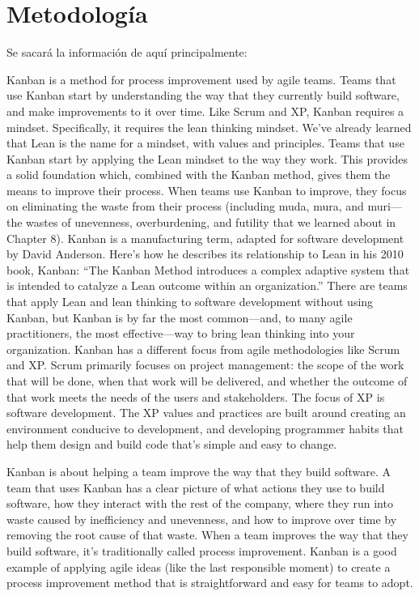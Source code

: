 \section{Metodología}\label{sec:metodologia}


Se sacará la información de aquí principalmente:
\cite{Cole2015-fd} %
\cite{Stellman2014-qr} %

Kanban is a method for process improvement used by agile teams. Teams that use
Kanban start by understanding the way that they currently build software, and make
improvements to it over time. Like Scrum and XP, Kanban requires a mindset.
Specifically, it requires the lean thinking mindset. We've already learned that
Lean is the
name for a mindset, with values and principles. Teams that use Kanban start by
applying the Lean mindset to the way they work. This provides a solid foundation
which, combined with the Kanban method, gives them the means to improve their
process. When teams use Kanban to improve, they focus on eliminating the waste
from their process (including muda, mura, and muri—the wastes of unevenness,
overburdening, and futility that we learned about in Chapter 8).
Kanban is a manufacturing term, adapted for software development by David
Anderson. Here's how he describes its relationship to Lean in his 2010 book,
Kanban: “The
Kanban Method introduces a complex adaptive system that is intended to catalyze a
Lean outcome within an organization.” There are teams that apply Lean and lean
thinking to software development without using Kanban, but Kanban is by far the
most common—and, to many agile practitioners, the most effective—way to bring
lean thinking into your organization.
Kanban has a different focus from agile methodologies like Scrum and XP. Scrum
primarily focuses on project management: the scope of the work that will be
done, when
that work will be delivered, and whether the outcome of that work meets the needs of
the users and stakeholders. The focus of XP is software development. The XP values
and practices are built around creating an environment conducive to development,
and developing programmer habits that help them design and build code that's simple and easy to change.

Kanban is about helping a team improve the way that they build software. A team that
uses Kanban has a clear picture of what actions they use to build software, how they
interact with the rest of the company, where they run into waste caused by
inefficiency and unevenness, and how to improve over time by removing the root
cause of
that waste. When a team improves the way that they build software, it's traditionally
called process improvement. Kanban is a good example of applying agile ideas (like the
last responsible moment) to create a process improvement method that is
straightforward and easy for teams to adopt.

